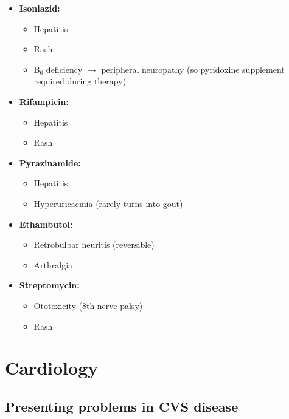 \documentclass[
  12pt,
]{memoir}
\providecommand{\tightlist}{%
  \setlength{\itemsep}{0pt}\setlength{\parskip}{0pt}}
\begin{document}
\begin{itemize}
\tightlist
\item
  \textbf{Isoniazid:}

  \begin{itemize}
  \tightlist
  \item
    Hepatitis
  \item
    Rash
  \item
    B\(_6\) deficiency \(\rightarrow\) peripheral neuropathy (so
    pyridoxine supplement required during therapy)
  \end{itemize}
\item
  \textbf{Rifampicin:}

  \begin{itemize}
  \tightlist
  \item
    Hepatitis
  \item
    Rash
  \end{itemize}
\item
  \textbf{Pyrazinamide:}

  \begin{itemize}
  \tightlist
  \item
    Hepatitis
  \item
    Hyperuricaemia (rarely turns into gout)
  \end{itemize}
\item
  \textbf{Ethambutol:}

  \begin{itemize}
  \tightlist
  \item
    Retrobulbar neuritis (reversible)
  \item
    Arthralgia
  \end{itemize}
\item
  \textbf{Streptomycin:}

  \begin{itemize}
  \tightlist
  \item
    Ototoxicity (8th nerve palsy)
  \item
    Rash
  \end{itemize}
\end{itemize}

\pagebreak

\hypertarget{cardiology}{%
\chapter{Cardiology}\label{cardiology}}

\hypertarget{presenting-problems-in-cvs-disease}{%
\section{Presenting problems in CVS
disease}\label{presenting-problems-in-cvs-disease}}
\end{document}
